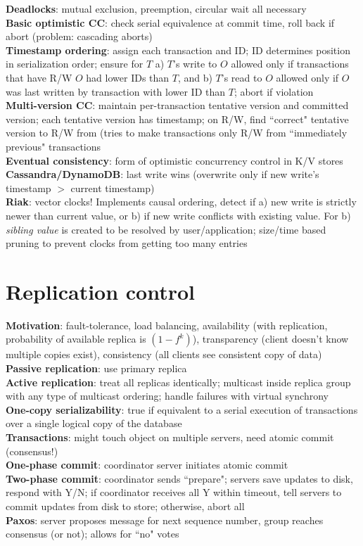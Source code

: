 \documentclass{article}
\begin{document}
\begin{multicols*}{3}
\textbf{Deadlocks}: mutual exclusion, preemption, circular wait all necessary \\
\textbf{Basic optimistic CC}: check serial equivalence at commit time, roll back if abort (problem: cascading aborts) \\
\textbf{Timestamp ordering}: assign each transaction and ID; ID determines position in serialization order; ensure for $T$ a) $T$'s write to $O$ allowed only if transactions that have R/W $O$ had lower IDs than $T$, and b) $T$'s read to $O$ allowed only if $O$ was last written by transaction with lower ID than $T$; abort if violation \\
\textbf{Multi-version CC}: maintain per-transaction tentative version and committed version; each tentative version has timestamp; on R/W, find ``correct" tentative version to R/W from (tries to make transactions only R/W from ``immediately previous" transactions \\
\textbf{Eventual consistency}: form of optimistic concurrency control in K/V stores \\
\textbf{Cassandra/DynamoDB}: last write wins (overwrite only if new write's timestamp $>$ current timestamp) \\
\textbf{Riak}: vector clocks! Implements causal ordering, detect if a) new write is strictly newer than current value, or b) if new write conflicts with existing value. For b) \textit{sibling value} is created to be resolved by user/application; size/time based pruning to prevent clocks from getting too many entries

\section{Replication control}
\textbf{Motivation}: fault-tolerance, load balancing, availability (with replication, probability of available replica is $(1 - f^k)$), transparency (client doesn't know multiple copies exist), consistency (all clients see consistent copy of data) \\
\textbf{Passive replication}: use primary replica \\
\textbf{Active replication}: treat all replicas identically; multicast inside replica group with any type of multicast ordering; handle failures with virtual synchrony \\
\textbf{One-copy serializability}: true if equivalent to a serial execution of transactions over a single logical copy of the database \\
\textbf{Transactions}: might touch object on multiple servers, need atomic commit (consensus!) \\
\textbf{One-phase commit}: coordinator server initiates atomic commit \\
\textbf{Two-phase commit}: coordinator sends ``prepare"; servers save updates to disk, respond with Y/N; if coordinator receives all Y within timeout, tell servers to commit updates from disk to store; otherwise, abort all \\
\textbf{Paxos}: server proposes message for next sequence number, group reaches consensus (or not); allows for ``no" votes


\end{multicols*}
\end{document}
